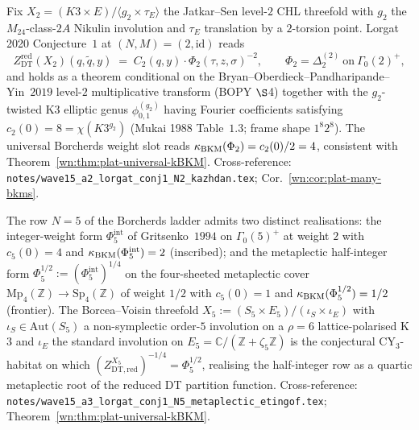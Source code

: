 \begin{theorem}[Lorgat Conjecture~$1$ at $N = 2$, conditional]
\ClaimStatusConjectured
\label{wn:thm:plat-w15-lorgat-N2}
Fix $X_2 = (K3 \times E)/\langle g_2 \times \tau_E\rangle$ the
Jatkar--Sen level-$2$ CHL threefold with $g_2$ the $M_{24}$-class-$2A$
Nikulin involution and $\tau_E$ translation by a $2$-torsion point.
Lorgat 2020 Conjecture~$1$ at $(N, M) = (2, \mathrm{id})$ reads
\[
  Z^{\mathrm{red}}_{\mathrm{DT}}(X_2)(q, \tilde q, y)
  \;=\; C_2(q, y) \cdot \Phi_2(\tau, z, \sigma)^{-2},
  \qquad \Phi_2 = \Delta_2^{(2)}\ \text{on}\ \Gamma_0(2)^+,
\]
and holds as a theorem conditional on the
Bryan--Oberdieck--Pandharipande--Yin~$2019$ level-$2$ multiplicative
transform (BOPY $\S$4) together with the $g_2$-twisted K3 elliptic
genus $\phi^{(g_2)}_{0,1}$ having Fourier coefficients satisfying
$c_2(0) = 8 = \chi(K3^{g_2})$ (Mukai 1988 Table~$1.3$; frame shape
$1^8 2^8$). The universal Borcherds weight slot reads
$\kappa_{\mathrm{BKM}}(\Phi_2) = c_2(0)/2 = 4$, consistent with
Theorem~\ref{wn:thm:plat-universal-kBKM}.
Cross-reference: \texttt{notes/wave15\_a2\_lorgat\_conj1\_N2\_kazhdan.tex};
Cor.~\ref{wn:cor:plat-many-bkms}.
\end{theorem}

\begin{conjecture}[Lorgat Conjecture~$1$ at $N = 5$: metaplectic
fourth-root]\ClaimStatusConjectured
\label{wn:conj:plat-w15-lorgat-N5}
The row $N = 5$ of the Borcherds ladder admits two distinct
realisations: the integer-weight form $\Phi_5^{\mathrm{int}}$ of
Gritsenko~$1994$ on $\Gamma_0(5)^+$ at weight $2$ with
$c_5(0) = 4$ and $\kappa_{\mathrm{BKM}}(\Phi_5^{\mathrm{int}}) = 2$ (inscribed);
and the metaplectic half-integer form
$\Phi_5^{1/2} := (\Phi_5^{\mathrm{int}})^{1/4}$ on the four-sheeted
metaplectic cover $\mathrm{Mp}_4(\mathbb{Z}) \to \mathrm{Sp}_4(\mathbb{Z})$
of weight $1/2$ with $c_5(0) = 1$ and
$\kappa_{\mathrm{BKM}}(\Phi_5^{1/2}) = 1/2$ (frontier). The Borcea--Voisin threefold
$X_5 := (S_5 \times E_5)/(\iota_S \times \iota_E)$ with
$\iota_S \in \mathrm{Aut}(S_5)$ a non-symplectic order-$5$
involution on a $\rho = 6$ lattice-polarised K$3$ and $\iota_E$ the
standard involution on $E_5 = \mathbb{C}/(\mathbb{Z} + \zeta_5 \mathbb{Z})$
is the conjectural CY$_3$-habitat on which
$(Z^{X_5}_{\mathrm{DT, red}})^{-1/4} = \Phi_5^{1/2}$, realising the
half-integer row as a quartic metaplectic root of the reduced DT
partition function.
Cross-reference: \texttt{notes/wave15\_a3\_lorgat\_conj1\_N5\_metaplectic\_etingof.tex};
Theorem~\ref{wn:thm:plat-universal-kBKM}.
\end{conjecture}

